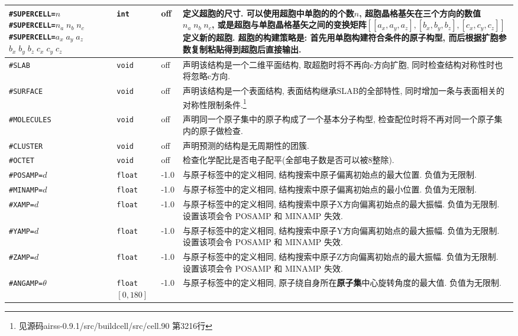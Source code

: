 \documentclass[a4paper, 10pt]{article}
\begin{document}
\begin{center}
\begin{longtable}{m{11em}|m{4em}<{\centering}|m{3em}<{\centering}|m{15em}}
\midrule
\verb|#SUPERCELL=|\(n\) \verb|#SUPERCELL=|\(n_a\;n_b\;n_c\;\;\;\;\;\;\) \hspace{2em}\verb|#SUPERCELL=|\(a_x\; a_y\;a_z\;\)\hspace{2em} \(b_x\;b_y\;b_z\;c_x\;c_y\;c_z\) & \verb|int| & off & 定义超胞的尺寸. 可以使用超胞中单胞的的个数\(n\), 超胞晶格基矢在三个方向的数值\(n_a\;n_b\;n_c\), 或是超胞与单胞晶格基矢之间的变换矩阵\([[a_x,a_y,a_z],[b_x,b_y,b_z],[c_x,c_y,c_z]]\)定义新的超胞. 超胞的构建策略是: 首先用单胞构建符合条件的原子构型, 而后根据扩胞参数复制粘贴得到超胞后直接输出.\\
\midrule
\verb|#SLAB| & \verb|void| & off & 声明该结构是一个二维平面结构, 取超胞时将不再向c方向扩胞, 同时检查结构对称性时也将忽略c方向.\\
\midrule
\verb|#SURFACE| & \verb|void| & off & 声明该结构是一个表面结构, 表面结构继承SLAB的全部特性, 同时增加一条与表面相关的对称性限制条件.\footnote{见源码airss-0.9.1/src/buildcell/src/cell.90 第3216行}\\
\midrule
\verb|#MOLECULES|& \verb|void| & off & 声明同一个原子集中的原子构成了一个基本分子构型, 检查配位时将不再对同一个原子集内的原子做检查.\\
\midrule
\verb|#CLUSTER| & \verb|void| & off & 声明预测的结构是无周期性的团簇.\\
\midrule
\verb|#OCTET|& \verb|void| & off & 检查化学配比是否电子配平(全部电子数是否可以被8整除).\\
\midrule
\verb|#POSAMP=|\(d\) & \verb|float|  & -1.0 & 与原子标签中的定义相同, 结构搜索中原子偏离初始点的最大位置. 负值为无限制.\\
\midrule
\verb|#MINAMP=|\(d\) & \verb|float| & -1.0 & 与原子标签中的定义相同, 结构搜索中原子偏离初始点的最小位置. 负值为无限制.\\
\midrule
\verb|#XAMP=|\(d\) & \verb|float| & -1.0 & 与原子标签中的定义相同, 结构搜索中原子X方向偏离初始点的最大振幅. 负值为无限制. 设置该项会令 POSAMP 和 MINAMP 失效. \\
\midrule
\verb|#YAMP=|\(d\) & \verb|float| & -1.0 & 与原子标签中的定义相同, 结构搜索中原子Y方向偏离初始点的最大振幅. 负值为无限制. 设置该项会令 POSAMP 和 MINAMP 失效.\\
\midrule
\verb|#ZAMP=|\(d\) & \verb|float| & -1.0 & 与原子标签中的定义相同, 结构搜索中原子Z方向偏离初始点的最大振幅. 负值为无限制. 设置该项会令 POSAMP 和 MINAMP 失效.\\
\midrule
\verb|#ANGAMP=|\(\theta\)& \verb|float| \([0,180]\) & -1.0 & 与原子标签中的定义相同, 原子绕自身所在\textbf{原子集}中心旋转角度的最大值. 负值为无限制.\\

\end{longtable}
\end{center}
\end{document}
